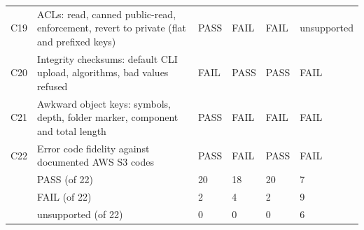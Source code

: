 \begin{tabular}{@{}llllll@{}}
C19 & ACLs: read, canned public-read, enforcement, revert to private (flat and prefixed keys) & PASS & FAIL & FAIL & unsupported \\
C20 & Integrity checksums: default CLI upload, algorithms, bad values refused & FAIL & PASS & PASS & FAIL \\
C21 & Awkward object keys: symbols, depth, folder marker, component and total length & PASS & FAIL & FAIL & FAIL \\
C22 & Error code fidelity against documented AWS S3 codes & PASS & FAIL & PASS & FAIL \\
\midrule
 & PASS (of 22) & 20 & 18 & 20 & 7 \\
 & FAIL (of 22) & 2 & 4 & 2 & 9 \\
 & unsupported (of 22) & 0 & 0 & 0 & 6 \\
\bottomrule
\end{tabular}
